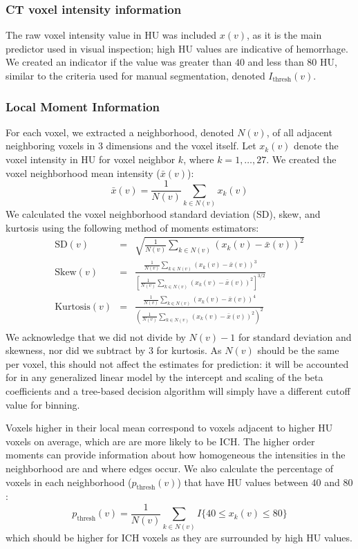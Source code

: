 \documentclass{elsarticle_nonatbib}\usepackage[]{graphicx}\usepackage[]{color}
\begin{document}
\subsubsection{CT voxel intensity information} The raw voxel intensity value in HU was included $x(v)$, as it is the main predictor used in visual inspection; high HU values are indicative of hemorrhage. We created an indicator if the value was greater than $40$ and less than $80$ HU, similar to the criteria used for manual segmentation, denoted $I_{\text{thresh}}(v)$. 

\subsubsection{Local Moment Information} For each voxel, we extracted a neighborhood, denoted $N(v)$, of all adjacent neighboring voxels in $3$ dimensions and the voxel itself.  Let $x_k(v)$ denote the voxel intensity in HU for voxel neighbor $k$, where $k = 1, \dots, 27$.  We created the voxel neighborhood mean intensity ($\bar{x}(v)$):
\begin{equation}
\bar{x}(v) = \frac{1}{N(v)} \sum_{k \in N(v)} x_k(v) \label{eq:mean}
\end{equation}
We calculated the voxel neighborhood standard deviation (SD), skew, and kurtosis using the following method of moments estimators:
\begin{eqnarray*}
\text{SD}(v) &=& \sqrt{ \frac{1}{N(v)} \sum_{k \in N(v)} \left(x_k(v) - \bar{x}(v)\right)^2 } \\
\text{Skew}(v) &=& \frac{ \frac{1}{N(v)} \sum\limits_{k \in N(v)} (x_k(v)-\bar{x}(v) )^3 } {\left[ \frac{1}{N(v)} \sum\limits_{k \in N(v)} (x_k(v)- \bar{x}(v))^2\right]^{3/2}} \\
\text{Kurtosis}(v) &=& \frac{ \frac{1}{N(v)} \sum\limits_{k \in N(v)} (x_k(v)-\bar{x}(v) )^4 }{ \left( \frac{1}{N(v)} \sum\limits_{k \in N(v)} \left(x_k(v) - \bar{x}(v)\right)^2\right)^2} \\
\label{eq:moment}
\end{eqnarray*}
We acknowledge that we did not divide by $N(v) - 1$ for standard deviation and skewness, nor did we subtract by $3$ for kurtosis.  As $N(v)$ should be the same per voxel, this should not affect the estimates for prediction: it will be accounted for in any generalized linear model by the intercept and scaling of the beta coefficients and a tree-based decision algorithm will simply have a different cutoff value for binning.

Voxels higher in their local mean correspond to voxels adjacent to higher HU voxels on average, which are are more likely to be ICH.  The higher order moments can provide information about how homogeneous the intensities in the neighborhood are and where edges occur.  We also calculate the percentage of voxels in each neighborhood ($p_{\text{thresh}}(v)$) that have HU values between $40$ and $80$:
\begin{equation}
p_{\text{thresh}}(v) = \frac{1}{N(v)} \sum_{k \in N(v)} I\{ 40 \leq x_k(v) \leq 80 \} \label{eq:pct}
\end{equation}
which should be higher for ICH voxels as they are surrounded by high HU values.  
\end{document}
